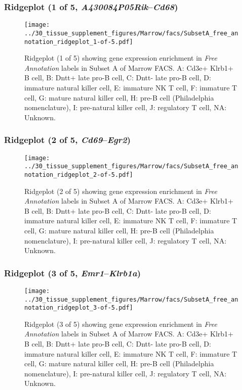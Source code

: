 \clearpage

\subsubsection{Ridgeplot (1 of 5, \emph{A430084P05Rik}--\emph{Cd68})}
\begin{figure}[h]
\centering
\texttt{[image: ../30\_tissue\_supplement\_figures/Marrow/facs/SubsetA\_free\_annotation\_ridgeplot\_1-of-5.pdf]}

\caption{ Ridgeplot (1 of 5)  showing gene expression enrichment in \emph{Free Annotation} labels in Subset A of Marrow FACS. A: Cd3e+ Klrb1+ B cell, B: Dntt+ late pro-B cell, C: Dntt- late pro-B cell, D: immature natural killer cell, E: immature NK T cell, F: immature T cell, G: mature natural killer cell, H: pre-B cell (Philadelphia nomenclature), I: pre-natural killer cell, J: regulatory T cell, NA: Unknown.}
\end{figure}


\clearpage

\subsubsection{Ridgeplot (2 of 5, \emph{Cd69}--\emph{Egr2})}
\begin{figure}[h]
\centering
\texttt{[image: ../30\_tissue\_supplement\_figures/Marrow/facs/SubsetA\_free\_annotation\_ridgeplot\_2-of-5.pdf]}

\caption{ Ridgeplot (2 of 5)  showing gene expression enrichment in \emph{Free Annotation} labels in Subset A of Marrow FACS. A: Cd3e+ Klrb1+ B cell, B: Dntt+ late pro-B cell, C: Dntt- late pro-B cell, D: immature natural killer cell, E: immature NK T cell, F: immature T cell, G: mature natural killer cell, H: pre-B cell (Philadelphia nomenclature), I: pre-natural killer cell, J: regulatory T cell, NA: Unknown.}
\end{figure}


\clearpage

\subsubsection{Ridgeplot (3 of 5, \emph{Emr1}--\emph{Klrb1a})}
\begin{figure}[h]
\centering
\texttt{[image: ../30\_tissue\_supplement\_figures/Marrow/facs/SubsetA\_free\_annotation\_ridgeplot\_3-of-5.pdf]}

\caption{ Ridgeplot (3 of 5)  showing gene expression enrichment in \emph{Free Annotation} labels in Subset A of Marrow FACS. A: Cd3e+ Klrb1+ B cell, B: Dntt+ late pro-B cell, C: Dntt- late pro-B cell, D: immature natural killer cell, E: immature NK T cell, F: immature T cell, G: mature natural killer cell, H: pre-B cell (Philadelphia nomenclature), I: pre-natural killer cell, J: regulatory T cell, NA: Unknown.}
\end{figure}


